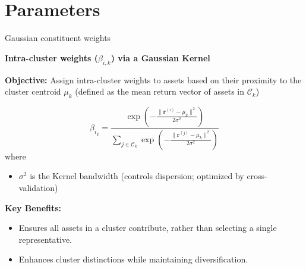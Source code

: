 \documentclass[dvipsnames,mathserif]{beamer}
\newcommand\mypv{\vfill \ifthenelse{\boolean{withPause}}{ \pause }{}}
\begin{document}
\section{Parameters}

\begin{frame}{Gaussian constituent weights}

    \textbf{Intra-cluster weights (\( \beta_{i,k} \)) via a Gaussian Kernel}

    \vspace{0.2cm}

    \textbf{Objective:} Assign intra-cluster weights to assets based on their proximity to the cluster centroid \( \mu_k \) (defined as the mean return vector of assets in \( \mathcal{C}_k \))

   \begin{equation}
    \beta_{i_k} = \frac{\exp\left(-\frac{\lVert \mathbf{r}^{(i)} - \mu_k \rVert^2}{2\sigma^2}\right)}{\sum_{j \in \mathcal{C}_k} \exp\left(-\frac{\lVert \mathbf{r}^{(j)} - \mu_k \rVert^2}{2\sigma^2}\right)}
   \end{equation}
where
    \begin{itemize}
        \item \( \sigma^2 \) is the Kernel bandwidth (controls dispersion;  optimized by cross-validation)  
    \end{itemize}

\mypv 

 \textbf{Key Benefits:}
    \begin{itemize}
        \item Ensures all assets in a cluster contribute, rather than selecting a single representative.
        \item Enhances cluster distinctions while maintaining diversification.
    \end{itemize}
    \vfill
\end{frame}
\end{document}

